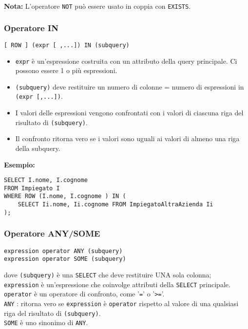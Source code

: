 \documentclass[a4paper, 10pt, titlepage]{article}
\begin{document}
			\noindent
			\textbf{Nota: } L’operatore \lstinline|NOT| può essere usato in coppia con \lstinline|EXISTS|.
			\bigskip
			
	\subsubsection{Operatore IN}
		\begin{lstlisting}
[ ROW ] (expr [ ,...]) IN (subquery)
		\end{lstlisting}
		
		\begin{itemize}
				\item \lstinline|expr| è un’espressione costruita con un attributo della query principale.
			Ci possono essere 1 o più espressioni.
			
				\item \lstinline|(subquery)| deve restituire un numero di colonne = numero di
			espressioni in \lstinline|(expr [,...])|.
			
				\item I valori delle espressioni vengono confrontati con i valori di ciascuna riga
			del risultato di \lstinline|(subquery)|.
			
				\item Il confronto ritorna vero se i valori sono uguali ai valori di almeno una
			riga della subquery.
			\end{itemize}
		\textbf{Esempio:} 
		\begin{lstlisting}
SELECT I.nome, I.cognome
FROM Impiegato I
WHERE ROW (I.nome, I.cognome ) IN (
    SELECT Ii.nome, Ii.cognome FROM ImpiegatoAltraAzienda Ii
);
		\end{lstlisting}
		
	\subsubsection{Operatore ANY/SOME}
		\begin{lstlisting}
expression operator ANY (subquery)
expression operator SOME (subquery)
		\end{lstlisting}
		\noindent
		dove \lstinline|(subquery)| è una \lstinline|SELECT| che deve restituire UNA sola colonna; \\
		\lstinline|expression| è un’espressione che coinvolge attributi della \lstinline|SELECT|
		principale.\\
		\lstinline|operator| è un operatore di confronto, come '\lstinline|=|' o '\lstinline|>=|'.\\
		\lstinline|ANY| : ritorna vero se \lstinline|expression| è \lstinline|operator| rispetto al valore di una qualsiasi riga del risultato di \lstinline|(subquery)|.\\
		\lstinline|SOME| è uno sinonimo di \lstinline|ANY|. \medskip
		
\end{document}
